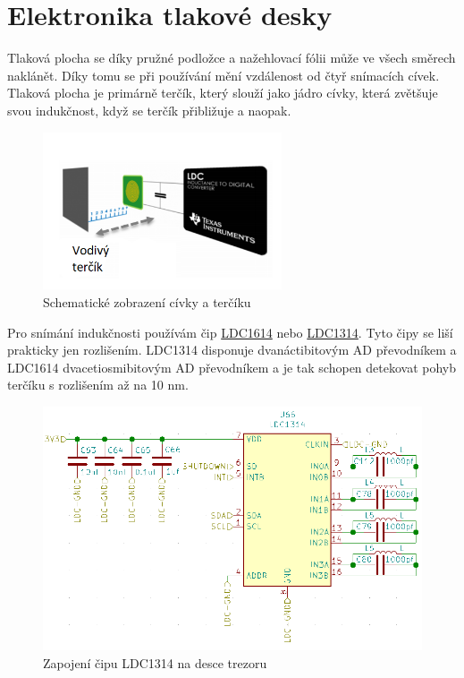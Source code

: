\section{Elektronika tlakové desky}
\label{E4-tlakovka}
Tlaková plocha se díky pružné podložce a nažehlovací fólii může ve všech směrech naklánět. Díky tomu se při používání mění vzdálenost od čtyř snímacích
cívek. Tlaková plocha je primárně terčík, který slouží jako jádro cívky, která zvětšuje svou indukčnost, když se terčík přibližuje a naopak.

\begin{figure}[htbp]
    \centering
    \includegraphics[width=200pt]{kapitoly/obrazky/E4/elektronika_tlakove_desky/civka_tercik_LDC.png}
    \caption{Schematické zobrazení cívky a terčíku \parencite{LDC-cd1}}
    \label{fig:E4-sch_civka_tercik}
\end{figure}

Pro snímání indukčnosti používám čip \href{https://www.ti.com/lit/ds/symlink/ldc1612.pdf?ts=1612018658531&ref_url=https%253A%252F%252Fwww.google.com%252F}{LDC1614} \parencite{LDC1614}
nebo \href{https://www.ti.com/lit/ds/symlink/ldc1312.pdf?ts=1612017390818&ref_url=https%253A%252F%252Fwww.google.com%252F}{LDC1314}.
Tyto čipy se liší prakticky jen rozlišením. LDC1314 disponuje dvanáctibitovým AD převodníkem a LDC1614 dvacetiosmibitovým AD převodníkem 
a je tak schopen detekovat pohyb terčíku s rozlišením až na 10 nm.

\begin{figure}[htbp]
    \centering
    \includegraphics[width=\textwidth]{kapitoly/obrazky/E4/elektronika_tlakove_desky/moje_zapojeni.png}
    \caption{Zapojení čipu LDC1314 na desce trezoru}
    \label{fig:E4-LDC}
\end{figure}

